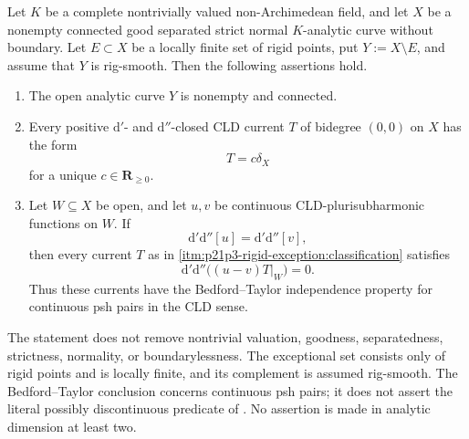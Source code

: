 
\begin{proposition}
\label{prop:p21p3-rigid-exception-extension}
Let $K$ be a complete nontrivially valued non-Archimedean field, and let
$X$ be a nonempty connected good separated strict normal $K$-analytic curve
without boundary.  Let $E\subset X$ be a locally finite set of rigid points, put
$Y:=X\setminus E$, and assume that $Y$ is rig-smooth.  Then the following
assertions hold.

\begin{enumerate}
\item\label{itm:p21p3-rigid-exception:connected}
The open analytic curve $Y$ is nonempty and connected.

\item\label{itm:p21p3-rigid-exception:classification}
Every positive $\mathrm d'$- and $\mathrm d''$-closed CLD current $T$ of
bidegree $(0,0)$ on $X$ has the form
\begin{equation}
\label{eq:p21p3-rigid-exception-classification}
                              T=c\delta_X
\end{equation}
for a unique $c\in\mathbf R_{\geq0}$.

\item\label{itm:p21p3-rigid-exception:bedford-taylor}
Let $W\subseteq X$ be open, and let $u,v$ be continuous
CLD-plurisubharmonic functions on $W$.  If
\begin{equation}
\label{eq:p21p3-rigid-exception-equal-curvature}
                  \mathrm d'\mathrm d''[u]
                  =\mathrm d'\mathrm d''[v],
\end{equation}
then every current $T$ as in
\cref{itm:p21p3-rigid-exception:classification} satisfies
\begin{equation}
\label{eq:p21p3-rigid-exception-bt-conclusion}
              \mathrm d'\mathrm d''\bigl((u-v)T|_W\bigr)=0.
\end{equation}
Thus these currents have the Bedford--Taylor independence property for
continuous psh pairs in the CLD sense.
\end{enumerate}
\end{proposition}

\begin{remark}
\label{rem:p21p3-rigid-exception-scope}
The statement does not remove nontrivial valuation, goodness,
separatedness, strictness, normality, or boundarylessness.  The exceptional
set consists only of rigid points and is locally finite, and its complement
is assumed rig-smooth.  The Bedford--Taylor conclusion concerns continuous
psh pairs; it does not assert the literal possibly discontinuous predicate
of \cite[Definition~8.6.2]{CLD25}.  No assertion is made in analytic
dimension at least two.
\end{remark}

